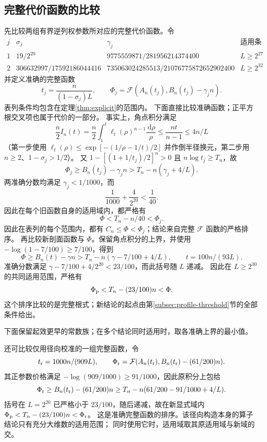 \documentclass[UTF8,a4paper,11pt,fontset=fandol]{ctexart}
\theoremstyle{remark}
\newcommand{\dint}{\,\mathrm d}
\newcommand{\Fcal}{\mathcal F}
\begin{document}
\subsection{完整代价函数的比较}
先比较两组有界逆列权参数所对应的完整代价函数。令
\[
 \begin{array}{c|c|c|c}
 j&\sigma_j&\gamma_j&\text{适用条件}\\ \hline
 1&19/2^{20}&9775559871/281956214374400&L\ge2^{27}\\
 2&306632997/17592186044416&735063024285513/21076775872652902400&L\ge2^{32}
 \end{array}
\]
并定义准确的完整函数
\[
 t_j=\frac{n}{(1-\sigma_j)L},\qquad
 \Phi_j=\Fcal(A_n(t_j),B_n(t_j)-\gamma_j n).
\]
表列条件均包含在定理\ref{thm:explicit}的范围内。
下面直接比较准确函数；正平方根交叉项也属于代价的一部分。
事实上，角点积分满足
\[
 \frac n2 I_n(t)=\frac n2\int_1^t\ell_t(\rho)^{n-1}\frac{\dint\rho}{\rho}
 \le\frac{nt}{n-1}\le4n/L
\]
（第一步使用 $\ell_t(\rho)\le\exp[-(1/\rho-1/t)/2]$ 并作倒半径换元，第二步用 $n\ge2$、$1-\sigma_j>1/2$）。
又 $1-[(1+1/t_j)/2]^n>0$ 且 $n\log t_j\ge T_n$，故
\[
 \Phi_j\ge B_n(t_j)-\gamma_jn
 >T_n-n(\gamma_j+4/L).
\]
两准确分数均满足 $\gamma_j<1/1000$，而
\[
 \frac1{1000}+\frac4{2^{20}}<\frac1{40}.
\]
因此在每个旧函数自身的适用域内，都严格有
\begin{equation}\label{eq:complete-comparison}
 \Phi<T_n-n/40<\Phi_j.
\end{equation}
因此在表列的每个范围内，都有 $C_n\le\Phi<\Phi_j$；结论来自完整 $\Fcal$ 函数的严格排序。
再比较新剖面函数与 $\Phi$。保留角点积分的上界，并使用 $-\log(1-7/100)\ge7/100$，得到
\[
 \Phi\ge B_n(t)-\gamma n>T_n-n(\gamma-7/100+4/L),
 \qquad t=100n/(93L).
\]
准确分数满足 $\gamma-7/100+4/2^{20}<23/100$，而此括号随 $L$ 递减。
因此在 $L\ge2^{30}$ 的共同适用范围，严格有
\[
 \Phi_{\rm p}<T_n-(23/100)n<\Phi.
\]
这个排序比较的是完整根式；新结论的起点由第\ref{subsec:profile-threshold}节的全部条件给出。

下面保留起效更早的常数族；在多个结论同时适用时，取各准确上界的最小值。

还可比较仅用径向校准的一组完整函数，令
\[
 t_{\rm r}=1000n/(909L),\qquad
 \Phi_{\rm r}=\Fcal(A_n(t_{\rm r}),B_n(t_{\rm r})-(61/200)n).
\]
其正参数价格满足 $-\log(909/1000)\ge91/1000$，因此原积分上包给
\[
 \Phi_{\rm r}\ge B_n(t_{\rm r})-(61/200)n
 \ge T_n-n(61/200-91/1000+4/L).
\]
括号在 $L=2^{20}$ 已严格小于 $23/100$，随后递减，故在新显式域内
$\Phi_{\rm p}<T_n-(23/100)n<\Phi_{\rm r}$。
这是准确完整函数的排序。该径向构造本身的算子结论只有充分大维数的适用范围；
同时使用它时，适用域取其原适用域与新域的交。
\end{document}
